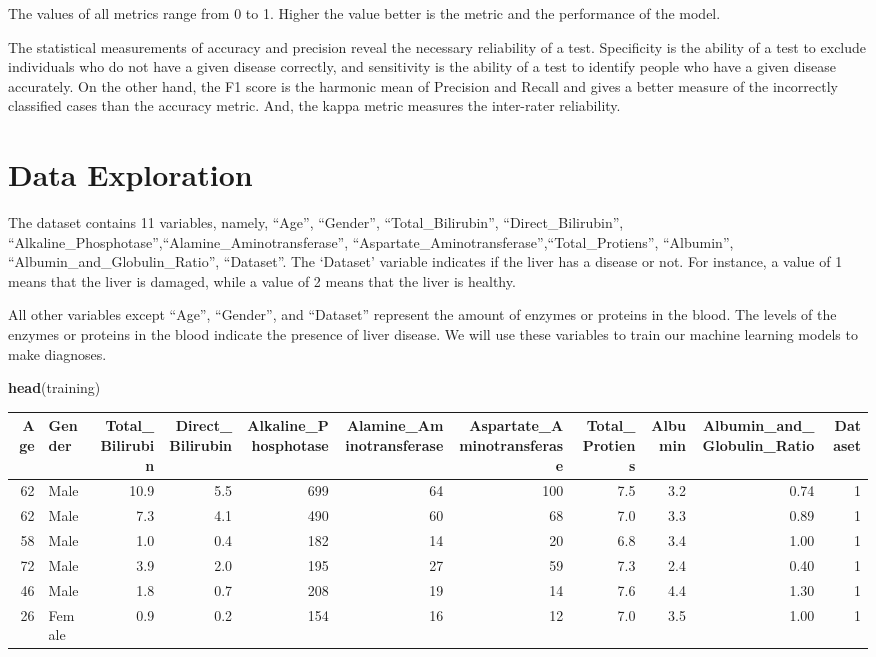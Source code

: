 \documentclass[]{article}
\newenvironment{Shaded}{\begin{snugshade}}{\end{snugshade}}
\newcommand{\KeywordTok}[1]{\textcolor[rgb]{0.13,0.29,0.53}{\textbf{#1}}}
\newcommand{\NormalTok}[1]{#1}
\begin{document}
The values of all metrics range from 0 to 1. Higher the value better is
the metric and the performance of the model.

The statistical measurements of accuracy and precision reveal the
necessary reliability of a test. Specificity is the ability of a test to
exclude individuals who do not have a given disease correctly, and
sensitivity is the ability of a test to identify people who have a given
disease accurately. On the other hand, the F1 score is the harmonic mean
of Precision and Recall and gives a better measure of the incorrectly
classified cases than the accuracy metric. And, the kappa metric
measures the inter-rater reliability.

\section{Data Exploration}
\label{sec:exploration}

The dataset contains 11 variables, namely, ``Age'', ``Gender'',
``Total\_Bilirubin'', ``Direct\_Bilirubin'',
``Alkaline\_Phosphotase'',``Alamine\_Aminotransferase'',
``Aspartate\_Aminotransferase'',``Total\_Protiens'', ``Albumin'',
``Albumin\_and\_Globulin\_Ratio'', ``Dataset''. The `Dataset' variable
indicates if the liver has a disease or not. For instance, a value of 1
means that the liver is damaged, while a value of 2 means that the liver
is healthy.

All other variables except ``Age'', ``Gender'', and ``Dataset''
represent the amount of enzymes or proteins in the blood. The levels of
the enzymes or proteins in the blood indicate the presence of liver
disease. We will use these variables to train our machine learning
models to make diagnoses.

\begin{Shaded}
\begin{Highlighting}[]
\KeywordTok{head}\NormalTok{(training)}
\end{Highlighting}
\end{Shaded}
\begin{longtable}[]{@{}rlrrrrrrrrr@{}}
\toprule
Age & Gender & Total\_Bilirubin & Direct\_Bilirubin &
Alkaline\_Phosphotase & Alamine\_Aminotransferase &
Aspartate\_Aminotransferase & Total\_Protiens & Albumin &
Albumin\_and\_Globulin\_Ratio & Dataset\tabularnewline
\midrule
\endhead
62 & Male & 10.9 & 5.5 & 699 & 64 & 100 & 7.5 & 3.2 & 0.74 &
1\tabularnewline
62 & Male & 7.3 & 4.1 & 490 & 60 & 68 & 7.0 & 3.3 & 0.89 &
1\tabularnewline
58 & Male & 1.0 & 0.4 & 182 & 14 & 20 & 6.8 & 3.4 & 1.00 &
1\tabularnewline
72 & Male & 3.9 & 2.0 & 195 & 27 & 59 & 7.3 & 2.4 & 0.40 &
1\tabularnewline
46 & Male & 1.8 & 0.7 & 208 & 19 & 14 & 7.6 & 4.4 & 1.30 &
1\tabularnewline
26 & Female & 0.9 & 0.2 & 154 & 16 & 12 & 7.0 & 3.5 & 1.00 &
1\tabularnewline
\bottomrule
\end{longtable}
\end{document}

